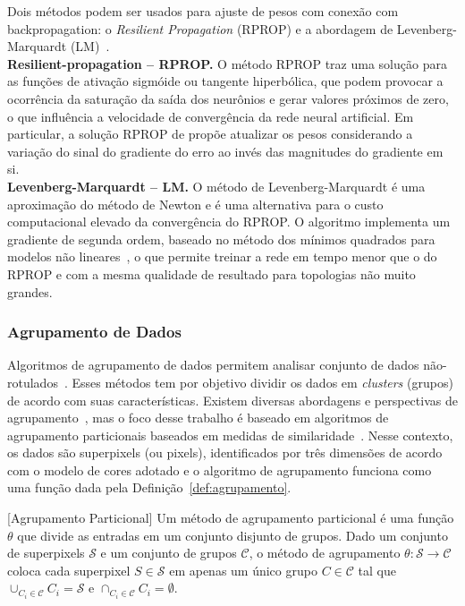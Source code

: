 Dois métodos podem ser usados para ajuste de pesos com conexão com backpropagation: o \textit{Resilient Propagation} (RPROP) e a abordagem de Levenberg-Marquardt (LM)~\cite{Riedmiller2005,Cortez2002}.\\

\noindent
\textbf{Resilient-propagation -- RPROP.}
O método RPROP traz uma solução para as funções de ativação sigmóide ou tangente hiperbólica, que podem provocar a ocorrência da saturação da saída dos neurônios e gerar valores próximos de zero, o que influência a velocidade de convergência da rede neural artificial.
Em particular, a solução RPROP de  propõe atualizar os pesos considerando a variação do sinal do gradiente do erro ao invés das magnitudes do gradiente em si.\\

\noindent
\textbf{Levenberg-Marquardt -- LM.}
O método de Levenberg-Marquardt é uma aproximação do método de Newton e é uma alternativa para o custo computacional elevado da convergência do RPROP.
O algoritmo implementa um gradiente de segunda ordem, baseado no método dos mínimos quadrados para modelos não lineares~\cite{Suratgar2005,Yu2011}, o que permite treinar a rede em tempo menor que o do RPROP e com a mesma qualidade de resultado para topologias não muito grandes.

\subsubsection{Agrupamento de Dados}

Algoritmos de agrupamento de dados permitem analisar conjunto de dados não-rotulados~\cite{Jain1988}.
Esses métodos tem por objetivo dividir os dados em \textit{clusters} (grupos) de acordo com suas características.
Existem diversas abordagens e perspectivas de agrupamento~\cite{Faceli2008}, mas o foco desse trabalho é baseado em algoritmos de agrupamento particionais baseados em medidas de similaridade~\cite{Aggarwal2015,hastie2009}.
Nesse contexto, os dados são superpixels (ou pixels), identificados por três dimensões de acordo com o modelo de cores adotado e o algoritmo de agrupamento funciona como uma função dada pela Definição~\ref{def:agrupamento}.

\begin{definition}\label{def:agrupamento}[Agrupamento Particional]
Um método de agrupamento  particional é uma função $\theta$ que divide as entradas em um conjunto disjunto de grupos.
Dado um conjunto de superpixels $\mathcal{S}$ e um conjunto de grupos $\mathcal{C}$, o método de agrupamento $\theta: \mathcal{S} \rightarrow \mathcal{C}$ coloca cada superpixel $S \in \mathcal{S}$ em apenas um único grupo $C \in \mathcal{C}$ tal que $\cup_{C_i \in \mathcal{C}} C_i = \mathcal{S}$ e $\cap_{C_i \in \mathcal{C}} C_i = \emptyset$.
\end{definition}

